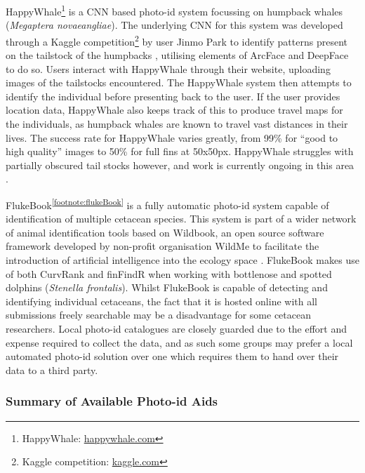 HappyWhale\footnote{\label{footnote:happyWhale}HappyWhale: \href{https://happywhale.com/}{happywhale.com}} is a CNN based photo-id system focussing on humpback whales (\textit{Megaptera novaeangliae}). The underlying CNN for this system was developed through a Kaggle competition\footnote{Kaggle competition: \href{https://www.kaggle.com/c/whale-categorization-playground}{kaggle.com}} by user Jinmo Park to identify patterns present on the tailstock of the humpbacks \cite{kaggle_humpback_2018}, utilising elements of ArcFace \cite{deng_arcface_2019} and DeepFace \cite{taigman_deepface_2014} to do so. Users interact with HappyWhale through their website, uploading images of the tailstocks encountered. The HappyWhale system then attempts to identify the individual before presenting back to the user. If the user provides location data, HappyWhale also keeps track of this to produce travel maps for the individuals, as humpback whales are known to travel vast distances in their lives. The success rate for HappyWhale varies greatly, from 99\% for ``good to high quality'' images to 50\% for full fins at 50x50px. HappyWhale struggles with partially obscured tail stocks however, and work is currently ongoing in this area \cite{cheeseman_happywhale_2019}. 

FlukeBook\textsuperscript{\ref{footnote:flukeBook}} is a fully automatic photo-id system capable of identification of multiple cetacean species. This system is part of a wider network of animal identification tools based on Wildbook, an open source software framework developed by non-profit organisation WildMe to facilitate the introduction of artificial intelligence into the ecology space \cite{berger-wolf_wildbook:_2017}. FlukeBook makes use of both CurvRank and finFindR when working with bottlenose and spotted dolphins (\textit{Stenella frontalis}). Whilst FlukeBook is capable of detecting and identifying individual cetaceans, the fact that it is hosted online with all submissions freely searchable may be a disadvantage for some cetacean researchers. Local photo-id catalogues are closely guarded due to the effort and expense required to collect the data, and as such some groups may prefer a local automated photo-id solution over one which requires them to hand over their data to a third party. 

\subsubsection{Summary of Available Photo-id Aids}\label{ch:Background,sec:conTech,sub:photoIDAides,subsub:Summary}

